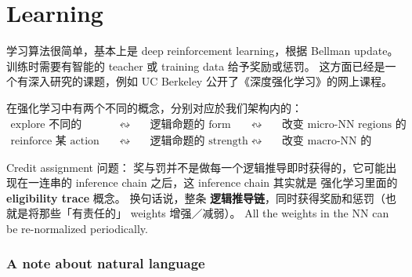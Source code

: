 \documentclass[orivec]{article}
\newcommand{\cc}[2]{#1}
\newcommand{\cc}[2]{#2}
\begin{document}
\section{Learning}

\cc{
学习算法很简单，基本上是 deep reinforcement learning，根据 Bellman update。 训练时需要有智能的 teacher 或 training data 给予奖励或惩罚。  这方面已经是一个有深入研究的课题，例如 UC Berkeley 公开了《深度强化学习》的网上课程。}{
Learning is simply the application of \textbf{deep reinforcement learning}, via the \textbf{Bellman update}.  Training requires rewards and punishment information from a teacher or training data set.  This is a well-researched topic, for example there is an online course on DRL from UC Berkeley.
}

在强化学习中有两个不同的概念，分别对应於我们架构内的：
\begin{equation}
\begin{alignedat}{4}
	\mbox{explore 不同的 actions} \quad &\leftrightsquigarrow& \quad \mbox{逻辑命题的 form} \quad &\leftrightsquigarrow& \quad \mbox{改变 micro-NN regions 的形状} \\
	\mbox{reinforce 某 action} \quad &\leftrightsquigarrow& \quad \mbox{逻辑命题的 strength} \quad &\leftrightsquigarrow& \quad \mbox{改变 macro-NN 的 weights} 
\end{alignedat}
\end{equation}

\cc{
Credit assignment 问题：  奖与罚并不是做每一个逻辑推导即时获得的，它可能出现在一连串的 inference chain 之后，这 inference chain 其实就是 强化学习里面的 \textbf{eligibility trace} 概念。  换句话说，整条 \textbf{逻辑推导链}，同时获得奖励和惩罚（也就是将那些「有责任的」 weights 增强／减弱）。  All the weights in the NN can be re-normalized periodically.}{
The \textbf{credit assignment} problem:  rewards and punishment is not instantly received after a single inference step, but may appear after a long \textbf{inference chain}.  This inference chain plays the same role as the \textbf{eligibility trace} in reinforcement learning.  In other words, the entire chain needs to be rewarded or punished during learning (in other words, increase or decrease the weights that were \textbf{responsible} in the inference chain).  All the weights in the NN can be re-normalized periodically.
}

\subsubsection{A note about natural language}
\end{document}
